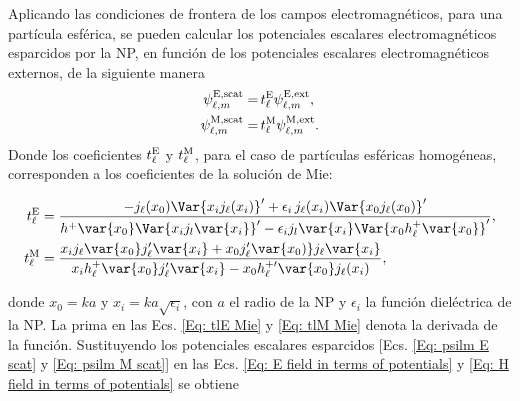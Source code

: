Aplicando las condiciones de frontera de los campos electromagnéticos, para una partícula esférica, se pueden calcular los potenciales escalares electromagnéticos esparcidos por la NP, en función de los potenciales escalares electromagnéticos externos, de la siguiente manera \cite{de1999relativistic}
\begin{align}
\psi_{\ell, m}^{\rm E, scat} =& \,t_{\ell}^{\rm E} \psi_{\ell, m}^{\rm E, \text{ext}}, \label{Eq: psilm E scat}\\
\psi_{\ell, m}^{\rm M, scat} =& \,t_{\ell}^{\rm M} \psi_{\ell, m}^{\rm M, \text{ext}}. \label{Eq: psilm M scat}
\end{align} 
Donde los coeficientes $t_{\ell}^{\rm E}$ y $t_{\ell}^{\rm M}$, para el caso de partículas esféricas homogéneas, corresponden a los coeficientes de la solución de Mie: \cite{Bohren}

\begin{align}
t_{\ell}^{\rm E} &=\frac{-j_{\ell}(x_0)\Var{x_i j_{\ell}(x_i)}^{\prime}+\epsilon_i\,j_{\ell}(x_i)\Var{x_0j_{\ell}(x_0)}^{\prime}}{h^{+}\var{x_0}\Var{x_i j_l\var{x_i}}^{\prime}-\epsilon_i j_l\var{x_i}\Var{x_0 h_{\ell}^{+}\var{x_0}}^{\prime}}, \label{Eq: tlE Mie}\\
t_{\ell}^{\rm M} &= \frac{x_i j_{\ell}\var{x_0}j_{\ell}^{\prime}\var{x_i}+ x_0 j_{\ell}^{\prime}\var{x_0)} j_{\ell}\var{x_i} }{x_i h_{\ell}^{+}\var{x_0} j_{\ell}^{\prime}\var{x_i} - x_0 h_{\ell}^{+ \prime}\var{x_0} j_{\ell}(x_i)}, \label{Eq: tlM Mie}
\end{align}

donde $x_0 = k a$ y $x_i = k a \sqrt{\epsilon_i}$, con $a$ el radio de la NP y $\epsilon_i$ la función dieléctrica de la NP. La prima en las Ecs. \eqref{Eq: tlE Mie} y \eqref{Eq: tlM Mie} denota la derivada de la función. Sustituyendo los potenciales escalares esparcidos [Ecs. \eqref{Eq: psilm E scat} y \eqref{Eq: psilm M scat}] en las Ecs. \eqref{Eq: E field in terms of potentials} y \eqref{Eq: H field in terms of potentials} se obtiene 

